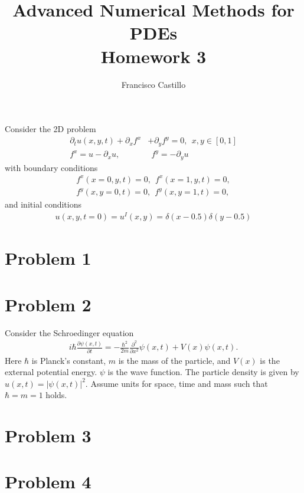 \documentclass[12pt,answers]{exam}
\begin{document}


\title{\textbf{Advanced Numerical Methods for PDEs}\\ \Large{Homework 3}}%
\author{Francisco Castillo}


\maketitle
Consider the 2D problem
\begin{align*}
\partial_tu(x,y,t) + \partial_xf^x &+ \partial_yf^y = 0,~~ x,y\in[0,1]\\
f^x = u - \partial_xu,&~~ f^y = - \partial_yu
\end{align*}
with boundary conditions
\begin{align*}
f^x(x=0,y,t) = 0,~~f^x(x=1,y,t) = 0,\\
f^y(x,y=0,t) = 0,~~f^y(x,y=1,t) = 0,
\end{align*}
and initial conditions
\begin{align*}
u(x,y,t=0) = u^I(x,y) = \delta(x-0.5)\delta(y-0.5)
\end{align*}
\section*{Problem 1}

\newpage
\section*{Problem 2}

\newpage

Consider the Schroedinger equation
\begin{align*}
i\hbar \frac{\partial\psi(x, t)}{\partial t}  = -\frac{\hbar^2}{2m}\frac{\partial^2}{\partial x^2}\psi(x,t) + V (x)\psi(x,t).
\end{align*}
Here $\hbar$ is Planck’s constant, $m$ is the mass of the particle,
and $V (x)$ is the external potential energy. $\psi$ is the wave
function. The particle density is given by $u(x, t) = |\psi(x, t)|^2$.
Assume units for space, time and mass such that $\hbar = m = 1$ holds.

\section*{Problem 3}

\newpage
\section*{Problem 4}

\end{document}

